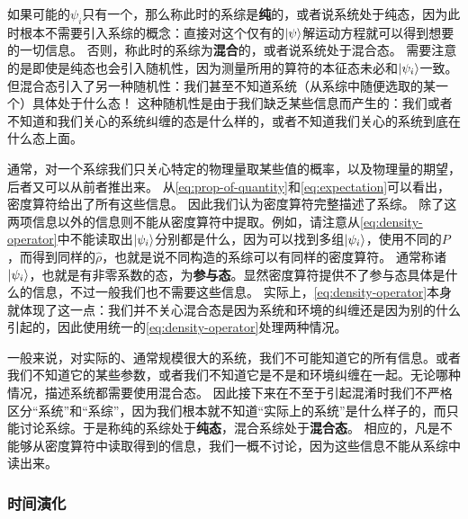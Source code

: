 \documentclass[hyperref, UTF8, a4paper]{ctexart}
\begin{document}
如果可能的$\psi_i$只有一个，那么称此时的系综是\textbf{纯}的，或者说系统处于纯态，因为此时根本不需要引入系综的概念：直接对这个仅有的$\ket{\psi}$解运动方程就可以得到想要的一切信息。
否则，称此时的系综为\textbf{混合}的，或者说系统处于混合态。
需要注意的是即使是纯态也会引入随机性，因为测量所用的算符的本征态未必和$\ket{\psi_i}$一致。
但混合态引入了另一种随机性：我们甚至不知道系统（从系综中随便选取的某一个）具体处于什么态！
这种随机性是由于我们缺乏某些信息而产生的：我们或者不知道和我们关心的系统纠缠的态是什么样的，或者不知道我们关心的系统到底在什么态上面。

通常，对一个系综我们只关心特定的物理量取某些值的概率，以及物理量的期望，后者又可以从前者推出来。
从\eqref{eq:prop-of-quantity}和\eqref{eq:expectation}可以看出，密度算符给出了所有这些信息。
因此我们认为密度算符完整描述了系综。
除了这两项信息以外的信息则不能从密度算符中提取。例如，请注意从\eqref{eq:density-operator}中不能读取出$\ket{\psi_i}$分别都是什么，因为可以找到多组$\ket{\psi_i}$，使用不同的$P$，而得到同样的$\hat{\rho}$，也就是说不同构造的系综可以有同样的密度算符。
通常称诸$\ket{\psi_i}$，也就是有非零系数的态，为\textbf{参与态}。显然密度算符提供不了参与态具体是什么的信息，不过一般我们也不需要这些信息。
实际上，\eqref{eq:density-operator}本身就体现了这一点：我们并不关心混合态是因为系统和环境的纠缠还是因为别的什么引起的，因此使用统一的\eqref{eq:density-operator}处理两种情况。

一般来说，对实际的、通常规模很大的系统，我们不可能知道它的所有信息。或者我们不知道它的某些参数，或者我们不知道它是不是和环境纠缠在一起。无论哪种情况，描述系统都需要使用混合态。
因此接下来在不至于引起混淆时我们不严格区分“系统”和“系综”，因为我们根本就不知道“实际上的系统”是什么样子的，而只能讨论系综。于是称纯的系综处于\textbf{纯态}，混合系综处于\textbf{混合态}。
相应的，凡是不能够从密度算符中读取得到的信息，我们一概不讨论，因为这些信息不能从系综中读出来。

\subsubsection{时间演化}
\end{document}
